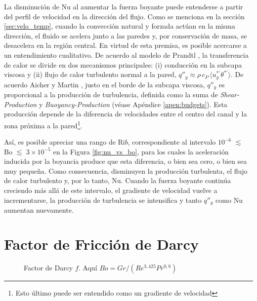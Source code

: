 La disminución de Nu al aumentar la fuerza boyante puede entenderse a partir del perfil de velocidad en la dirección del flujo. Como se menciona en la sección \ref{sec:velo_temp}, cuando la convección natural y forzada actúan en la misma dirección, el fluido se acelera junto a las paredes y, por conservación de masa, se desacelera en la región central. En virtud de esta premisa, es posible acercarse a un entendimiento cualitativo. De acuerdo al modelo de Prandtl \cite{Prandtl1942}, la transferencia de calor se divide en dos mecanismos principales: (i) conducción en la subcapa viscosa y (ii) flujo de calor turbulento normal a la pared, $q''_y \approx \rho \, c_P \, \langle u^{*'}_y \theta^{*'} \rangle$. De acuerdo Aicher y Martin \cite{aicher1997}, justo en el borde de la subcapa viscosa, $q''_y$ es proporcional a la producción de turbulencia, definida como la suma de \textit{Shear-Production} y \textit{Buoyancy-Production} (véase Apéndice \ref{apen:budgets}). Esta producción depende de la diferencia de velocidades entre el centro del canal y la zona próxima a la pared\footnote{Esto último puede ser entendido como un gradiente de velocidad}.  

Así, es posible apreciar una rango de Ri$b$, correspondiente al intervalo $10^{-6}$ $\lesssim$ Bo $\lesssim$ $3 \times 10^{-5}$ en la Figura \ref{fig:nu_vs_bo}, para los cuales la aceleración inducida por la boyancia produce que esta diferencia, o bien sea cero, o bien sea muy pequeña. Como consecuencia, disminuyen la producción turbulenta, el flujo de calor turbulento y, por lo tanto, Nu. Cuando la fuerza boyante continúa creciendo más allá de este intervalo, el gradiente de velocidad vuelve a incrementarse, la producción de turbulencia se intensifica y tanto $q''_y$ como Nu aumentan nuevamente.

\newpage
\section{Factor de Fricción de Darcy}

\begin{figure}[H]
  \centering
  \caption{Factor de Darcy $ f$. Aquí $Bo = Gr / (Re^{3,425} Pr^{0,8})$}
  \label{fig:darcy_vs_bo}
\end{figure}

